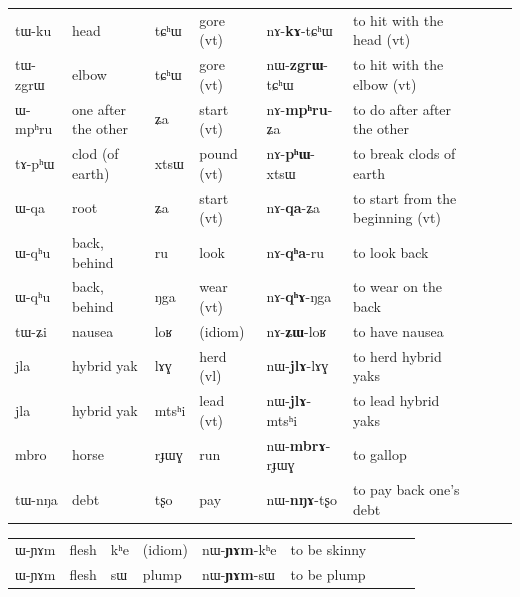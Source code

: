 \documentclass[oldfontcommands,oneside,a4paper,11pt]{article}
\newcommand{\ipa}[1]{{\phon #1}} %
\begin{document}
\begin{landscape}
\begin{table}[h]
\begin{tabular}{lllllllll}
  \ipa{tɯ-ku} & head & \ipa{tɕʰɯ} & gore (vt)  & \ipa{nɤ-\textbf{kɤ}-tɕʰɯ} & to hit with the head (vt)  \\
    \ipa{tɯ-zgrɯ} & elbow & \ipa{tɕʰɯ} & gore (vt)  & \ipa{nɯ-\textbf{zgrɯ}-tɕʰɯ} & to hit with the elbow (vt)  \\
   \ipa{ɯ-mpʰru} & one after the other & \ipa{ʑa} & start (vt) & \ipa{nɤ-\textbf{mpʰru}-ʑa} & to do after after the other  \\
  \ipa{tɤ-pʰɯ} & clod (of earth) & \ipa{xtsɯ} & pound (vt)& \ipa{nɤ-\textbf{pʰɯ}-xtsɯ} & to break clods of earth  \\
   \ipa{ɯ-qa} & root & \ipa{ʑa} & start (vt) &\ipa{nɤ-\textbf{qa}-ʑa} & to start from the beginning (vt)  \\
  \ipa{ɯ-qʰu} & back, behind & \ipa{ru} & look & \ipa{nɤ-\textbf{qʰa}-ru} &to  look back  \\

  \ipa{ɯ-qʰu} & back, behind  & \ipa{ŋga} & wear (vt)& \ipa{nɤ-\textbf{qʰɤ}-ŋga} & to wear on the back  \\
   \ipa{tɯ-ʑi} & nausea & \ipa{loʁ} & (idiom) & \ipa{nɤ-\textbf{ʑɯ}-loʁ} & to have nausea  \\
   
   
  \ipa{jla} & hybrid yak & \ipa{lɤɣ} & herd (vl) & \ipa{nɯ-\textbf{jlɤ}-lɤɣ} & to herd hybrid yaks   \\
  \ipa{jla} & hybrid yak & \ipa{mtsʰi} & lead (vt) & \ipa{nɯ-\textbf{jlɤ}-mtsʰi} & to lead hybrid yaks  \\
  \ipa{mbro} & horse & \ipa{rɟɯɣ} & run & \ipa{nɯ-\textbf{mbrɤ}-rɟɯɣ} & to gallop  \\
  \ipa{tɯ-nŋa} & debt & \ipa{tʂo} & pay & \ipa{nɯ-\textbf{nŋɤ}-tʂo} & to pay back one's debt  \\   



 \end{tabular} 
\end{table}      
         
     \begin{table} [h] 
\begin{tabular}{lllllllll}         
      \ipa{ɯ-ɲɤm} & flesh & \ipa{kʰe} & (idiom) & \ipa{nɯ-\textbf{ɲɤm}-kʰe} & to be skinny    \\ 
      \ipa{ɯ-ɲɤm} & flesh & \ipa{sɯ} & plump & \ipa{nɯ-\textbf{ɲɤm}-sɯ} & to be plump    \\ 
      

\end{tabular}
\end{table}
\end{landscape}
\end{document}
